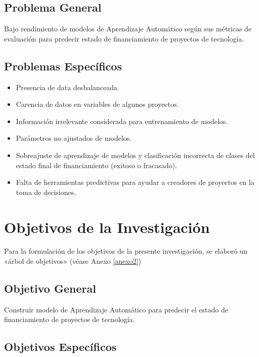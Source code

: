 \subsection{Problema General}
\newcommand{\ProblemaGeneral}{
Bajo rendimiento de modelos de Aprendizaje Automático según sus métricas de evaluación para predecir estado de financiamiento de proyectos de tecnología. 
}
\ProblemaGeneral
\subsection{Problemas Específicos}
\newcommand{\Pbone}{
Presencia de data desbalanceada.
}
\newcommand{\Pbtwo}{
Carencia de datos en variables de algunos proyectos.
}
\newcommand{\Pbthree}{
Información irrelevante considerada para entrenamiento de modelos.
}
\newcommand{\Pbfour}{
Parámetros no ajustados de modelos.
}
\newcommand{\Pbfive}{
Sobreajuste de aprendizaje de modelos y clasificación incorrecta de clases del estado final de financiamiento (exitoso o fracasado).
}
\newcommand{\Pbsix}{
Falta de herramientas predictivas para ayudar a creadores de proyectos en la toma de decisiones.
}

\begin{itemize}
	\item {\Pbone}
	\item {\Pbtwo}
	\item {\Pbthree}
	\item {\Pbfour}
	\item {\Pbfive}
	\item {\Pbsix}
\end{itemize}

\section{Objetivos de la Investigación}
Para la formulación de los objetivos de la presente investigación, se elaboró un «árbol de objetivos» (véase Anexo \ref{anexo2}) 
\subsection{Objetivo General}
\newcommand{\ObjetivoGeneral}{
Construir modelo de Aprendizaje Automático para predecir el estado de financiamiento de proyectos de tecnología.
}
\ObjetivoGeneral
\subsection{Objetivos Específicos}
\newcommand{\Objone}{
Utilizar técnicas de Machine Learning para trabajar con data desbalanceada.
}
\newcommand{\Objtwo}{
Imputar datos faltantes o incompletos de proyectos.
}
\newcommand{\Objthree}{
Definir información relevante para entrenamiento de modelos.
}
\newcommand{\Objfour}{
Ajustar parámetros de modelos.
}
\newcommand{\Objfive}{
Evitar sobreajuste de aprendizaje del modelo y clasificación incorrecta de clases del estado final de financiamiento (exitoso o fracasado).
}
\newcommand{\Objsix}{
Ofrecer herramienta analítica y predictiva a creadores de proyectos para ayudar en la toma de decisiones.
}

